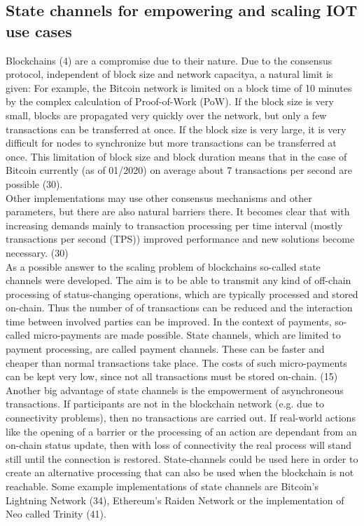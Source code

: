 \documentclass[conference]{IEEEtran}
\begin{document}
\subsection{State channels for empowering and scaling IOT use cases}
Blockchains (4) are a compromise due to their nature. Due to the consensus protocol, independent of block size and network capacitya, a natural limit is given: For example, the Bitcoin network is limited on a block time of 10 minutes by the complex calculation of Proof-of-Work (PoW). If the block size is very small, blocks are propagated very quickly over the network, but only a few transactions can be transferred at once. If the block size is very large, it is very difficult for nodes to synchronize but more transactions can be transferred at once. This limitation of block size and block duration means that in the case of Bitcoin currently (as of 01/2020) on average about 7 transactions per second are possible (30).\\
Other implementations may use other consensus mechanisms and other parameters, but there are also natural barriers there. It becomes clear that with increasing demands mainly to transaction processing per time interval (mostly transactions per second (TPS)) improved performance and new solutions become necessary. (30)\\
As a possible answer to the scaling problem of blockchains so-called state channels were developed. The aim is to be able to transmit any kind of off-chain processing of status-changing operations, which are typically processed and stored on-chain. Thus the number of of transactions can be reduced and the interaction time between involved parties can be improved. In the context of payments, so-called micro-payments are made possible. State channels, which are limited to payment processing, are called payment channels. These can be faster and cheaper than normal transactions take place. The costs of such micro-payments can be kept very low, since not all transactions must be stored on-chain. (15)\\
Another big advantage of state channels is the empowerment of asynchroneous transactions. If participants are not in the blockchain network (e.g. due to connectivity problems), then no transactions are carried out. If real-world actions like the opening of a barrier or the processing of an action are dependant from an on-chain status update, then with loss of connectivity the real process will stand still until the connection is restored. State-channels could be used here in order to create an alternative processing that can also be used when the blockchain is not reachable. Some example implementations of state channels are Bitcoin's Lightning Network (34), Ethereum's Raiden Network or the implementation of Neo called Trinity (41).\\
\end{document}
